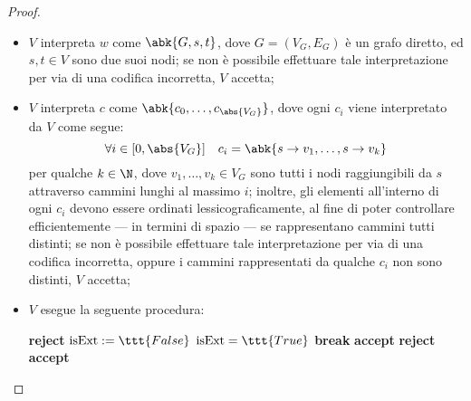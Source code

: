 \documentclass[a4paper, 12pt]{report}
\begin{document}
\begin{proof}
        \begin{itemize}
            \item $V$ interpreta $w$ come $\abk{G, s, t}$, dove $G = (V_G, E_G)$ è un grafo diretto, ed $s, t \in V$ sono due suoi nodi; se non è possibile effettuare tale interpretazione per via di una codifica incorretta, $V$ accetta;
            \item $V$ interpreta $c$ come $\abk{c_0, \ldots, c_{\abs{V_G}}}$, dove ogni $c_i$ viene interpretato da $V$ come segue: $$\forall i \in [0, \abs{V_G}] \quad c_i = \abk{s \to v_1, \ldots, s \to v_k}$$ per qualche $k\in \N$, dove $v_1, \ldots, v_k \in V_G$ sono tutti i nodi raggiungibili da $s$ attraverso cammini lunghi al massimo $i$; inoltre, gli elementi all'interno di ogni $c_i$ devono essere ordinati lessicograficamente, al fine di poter controllare efficientemente --- in termini di spazio --- se rappresentano cammini tutti distinti; se non è possibile effettuare tale interpretazione per via di una codifica incorretta, oppure i cammini rappresentati da qualche $c_i$ non sono distinti, $V$ accetta;
            \item $V$ esegue la seguente procedura:
                \begin{algorithmic}[1]
                         
                                \State \textbf{reject}
                            \EndIf
                        \EndFor
                        \For{$i \in [0, \abs{V_G})$}
                                \State $\textrm{isExt} := \ttt{False}$
                                        \State $\textrm{isExt} = \ttt{True}$
                                        \State \textbf{break}
                                    \EndIf
                                \EndFor
                                    \State \textbf{accept}
                                \EndIf
                            \EndFor
                                \State \textbf{reject}
                            \EndIf
                        \EndFor
                        \State \textbf{accept}
                    \EndFunction
                \end{algorithmic}
        \end{itemize}


\end{proof}
\end{document}
